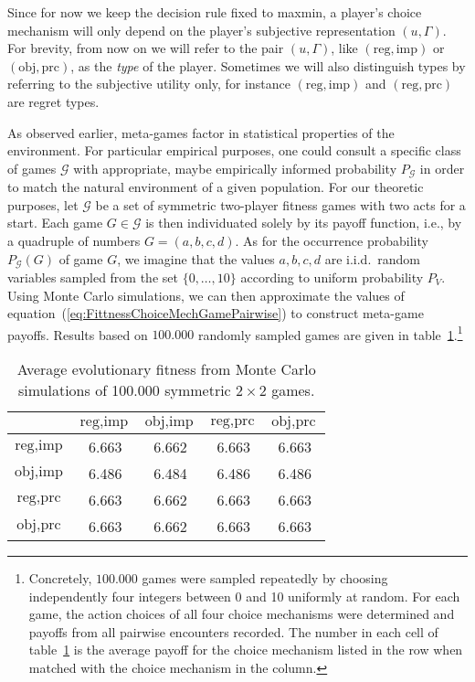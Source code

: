 \documentclass[fleqn,reqno,12pt]{article}
\theoremstyle{Satz}
\theoremstyle{Bsp}
\begin{document}
Since for now we keep the decision rule fixed to maxmin, a player's choice mechanism will only depend on the player's subjective representation $ (u,\Gamma) $. For brevity, from now on we will refer to the pair $ (u,\Gamma)$, like $(\text{reg}, \text{imp})$ or $(\text{obj}, \text{prc})$, as the \textit{type} of the player. Sometimes we will also distinguish types by referring to the subjective utility only, for instance $(\text{reg}, \text{imp})$ and $(\text{reg}, \text{prc})$ are regret types.

As observed earlier, meta-games factor in statistical properties of the environment. For particular
empirical purposes, one could consult a specific class of games $\mathcal{G}$ with appropriate,
maybe empirically informed probability $P_{\mathcal{G}}$ in order to match the natural
environment of a given population. For our theoretic purposes, let $\mathcal{G}$ be a set of symmetric
two-player fitness games with two acts for a start. Each game $G \in \mathcal{G}$ is then individuated solely by its payoff
function, i.e., by a quadruple of numbers $G=(a,b,c,d)$. As for the occurrence probability
$P_{\mathcal{G}}(G)$ of game $G$, we imagine that the values $a,b,c,d$ are i.i.d.~random
variables sampled from the set $ \lbrace 0, \dots, 10 \rbrace$ according to uniform probability
$P_{V}$. Using Monte Carlo simulations, we can then approximate the values of
equation~(\ref{eq:FittnessChoiceMechGamePairwise}) to construct meta-game payoffs. Results
based on $100.000$ randomly sampled games are given in
table~\ref{tab:ExpectedFitness_4Types}.\footnote{Concretely, $100.000$ games were sampled
  repeatedly by choosing independently four integers between 0 and 10 uniformly at random. For
  each game, the action choices of all four choice mechanisms were determined and payoffs from
  all pairwise encounters recorded. The number in each cell of
  table~\ref{tab:ExpectedFitness_4Types} is the average payoff for the choice mechanism listed
  in the row when matched with the choice mechanism in the column.}

\begin{table}[t]
\centering
\begin{tabular}{ccccc}
  \toprule
 & $\text{reg}, \text{imp}$ 
 & $\text{obj}, \text{imp}$ 
 & $\text{reg}, \text{prc}$ 
 & $\text{obj}, \text{prc}$ \\ 
  \midrule
  $\text{reg}, \text{imp}$ & 6.663 & 6.662 & 6.663 & 6.663 \\ 
  $\text{obj}, \text{imp}$ & 6.486 & 6.484 & 6.486 & 6.486 \\ 
  $\text{reg}, \text{prc}$ & 6.663 & 6.662 & 6.663 & 6.663 \\  
  $\text{obj}, \text{prc}$ & 6.663 & 6.662 & 6.663 & 6.663 \\ 
   \bottomrule
\end{tabular}                    
\caption{Average evolutionary fitness from Monte Carlo simulations of 100.000 symmetric $2 \times 2$ games.}
\label{tab:ExpectedFitness_4Types}
\end{table}
\end{document}

